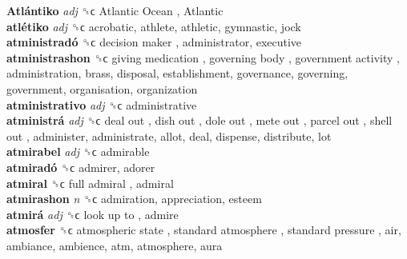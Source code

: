 \textbf{Atlántiko} \emph{adj}  ␝ϲ   Atlantic Ocean ,  Atlantic   \\
\textbf{atlétiko} \emph{adj}  ␝ϲ  acrobatic, athlete, athletic, gymnastic, jock  \\
\textbf{atministradó} ␝ϲ   decision maker , administrator, executive  \\
\textbf{atministrashon} ␝ϲ   giving medication ,  governing body ,  government activity , administration, brass, disposal, establishment, governance, governing, government, organisation, organization  \\
\textbf{atministrativo} \emph{adj}  ␝ϲ  administrative  \\
\textbf{atministrá} \emph{adj}  ␝ϲ   deal out ,  dish out ,  dole out ,  mete out ,  parcel out ,  shell out , administer, administrate, allot, deal, dispense, distribute, lot  \\
\textbf{atmirabel} \emph{adj}  ␝ϲ  admirable  \\
\textbf{atmiradó} ␝ϲ  admirer, adorer  \\
\textbf{atmiral} ␝ϲ   full admiral , admiral  \\
\textbf{atmirashon} \emph{n}  ␝ϲ  admiration, appreciation, esteem  \\
\textbf{atmirá} \emph{adj}  ␝ϲ   look up to , admire  \\
\textbf{atmosfer} ␝ϲ   atmospheric state ,  standard atmosphere ,  standard pressure , air, ambiance, ambience, atm, atmosphere, aura  \\

